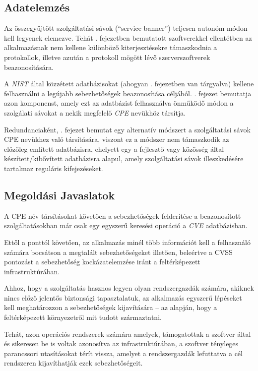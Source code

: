 \subsection*{Adatelemzés}

	Az összegyűjtött szolgáltatási sávok (``service banner'') teljesen autonóm módon kell legyenek elemezve. Tehát \az{\ref{relwork}}. fejezetben bemutatott szoftverekkel ellentétben az alkalmazásnak nem kellene különböző kiterjesztésekre támaszkodnia a protokollok, illetve azután a protokoll mögött lévő szerverszoftverek beazonosítására.

	A \textit{NIST} által közzétett adatbázisokat (ahogyan \az{\ref{ssec:vulndbs}}. fejezetben van tárgyalva) kellene felhasználni a legújabb sebezhetőségek beazonosítása céljából. \Az{\ref{ssec:matchcpe}}. fejezet bemutatja azon komponenst, amely ezt az adatbázist felhasználva önműködő módon a szolgálati sávokat a nekik megfelelő \textit{CPE} nevükhöz társítja.

	Redundanciaként, \az{\ref{ssec:patternmatch}}. fejezet bemutat egy alternatív módszert a szolgáltatási sávok CPE nevükhez való társítására, viszont ez a módszer nem támaszkodik az előzőleg említett adatbázisra, ehelyett egy a fejlesztő vagy közösség által készített/kibővített adatbázisra alapul, amely szolgáltatási sávok illeszkedésére tartalmaz reguláris kifejezéseket.

\subsection*{Megoldási Javaslatok}

	A CPE-név társításokat követően a sebezhetőségek felderítése a beazonosított szolgáltatásokban már csak egy egyszerű keresési operáció a \textit{CVE} adatbázisban.
	
	Ettől a ponttól követően, az alkalmazás minél több információt kell a felhasználó számára bocsátson a megtalált sebezhetőségeket illetően, beleértve a CVSS pontozást a sebezhetőség kockázatelemzése iránt a feltérképezett infrastruktúrában.

	Ahhoz, hogy a szolgáltatás hasznos legyen olyan rendszergazdák számára, akiknek nincs előző jelentős biztonsági tapasztalatuk, az alkalmazás egyszerű lépéseket kell meghatározzon a sebezhetőségek kijavítására -- az alapján, hogy a feltérképezett környezetről mit tudott származtatni.

	Tehát, azon operációs rendszerek számára amelyek, támogatottak a szoftver által és sikeresen be is voltak azonosítva az infrastruktúrában, a szoftver tényleges parancssori utasításokat térít vissza, amelyet a rendszergazdák lefuttatva a cél rendszeren kijavíthatják ezek sebezhetőségeit.
	
